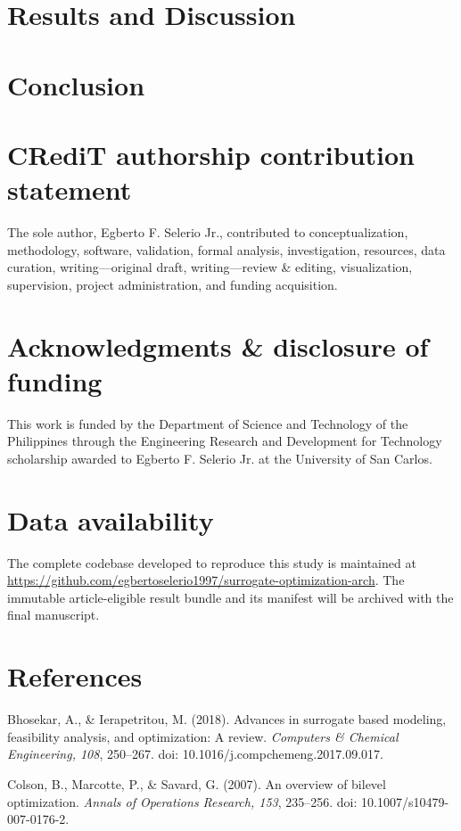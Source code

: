 \documentclass[a4paper,fleqn]{cas-sc}
\begin{document}
\section{Results and Discussion}

\section{Conclusion}

\section*{CRediT authorship contribution statement}

The sole author, Egberto F. Selerio Jr., contributed to conceptualization, methodology, software, validation, formal analysis, investigation, resources, data curation, writing---original draft, writing---review \& editing, visualization, supervision, project administration, and funding acquisition.

\section*{Acknowledgments \& disclosure of funding}

This work is funded by the Department of Science and Technology of the Philippines through the Engineering Research and Development for Technology scholarship awarded to Egberto F. Selerio Jr. at the University of San Carlos.

\section*{Data availability}

The complete codebase developed to reproduce this study is maintained at \url{https://github.com/egbertoselerio1997/surrogate-optimization-arch}. The immutable article-eligible result bundle and its manifest will be archived with the final manuscript.

\section*{References}

\noindent Bhosekar, A., \& Ierapetritou, M. (2018). Advances in surrogate based modeling, feasibility analysis, and optimization: A review. \textit{Computers \& Chemical Engineering, 108}, 250--267. doi: 10.1016/j.compchemeng.2017.09.017.

\noindent Colson, B., Marcotte, P., \& Savard, G. (2007). An overview of bilevel optimization. \textit{Annals of Operations Research, 153}, 235--256. doi: 10.1007/s10479-007-0176-2.
\end{document}
